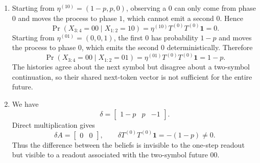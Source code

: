 \documentclass[11pt]{article}
\begin{document}
\begin{solution}[ex:p3-2]
\begin{enumerate}
      \item Starting from $\eta^{(10)}=(1-p,p,0)$, observing a $0$ can only
        come from phase $0$ and moves the process to phase $1$, which cannot
        emit a second $0$. Hence
        \[
          \Pr(X_{3:4}=00\mid X_{1:2}=10)
            =\eta^{(10)}T^{(0)}T^{(0)}\mathbf 1=0.
        \]
        Starting from $\eta^{(01)}=(0,0,1)$, the first $0$ has probability
        $1-p$ and moves the process to phase $0$, which emits the second $0$
        deterministically. Therefore
        \[
          \Pr(X_{3:4}=00\mid X_{1:2}=01)
            =\eta^{(01)}T^{(0)}T^{(0)}\mathbf 1=1-p.
        \]
        The histories agree about the next symbol but disagree about a
        two-symbol continuation, so their shared next-token vector is not
        sufficient for the entire future.

      \item We have
        \[
          \delta
            =\begin{bmatrix}1-p&p&-1\end{bmatrix}.
        \]
        Direct multiplication gives
        \[
          \delta A=\begin{bmatrix}0&0\end{bmatrix},
          \qquad
          \delta T^{(0)}T^{(0)}\mathbf 1=-(1-p)\neq0.
        \]
        Thus the difference between the beliefs is invisible to the one-step
        readout but visible to a readout associated with the two-symbol future
        $00$.
    \end{enumerate}
\end{solution}
\end{document}
